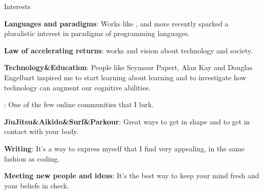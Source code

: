 \begin{rubric}{Interests}{

    \entry* \textbf{Languages and paradigms}: Works like
    ,
     and more recently
     sparked a pluralistic interest
    in paradigms of programming languages.

    \entry* \textbf{Law of accelerating returns}:  works and
    vision about technology and society. 

    \entry* \textbf{Technology\&Education}: People like 
    Seymour Papert, Alan Kay and Douglas Engelbart inspired me to
    start learning about learning and to investigate how technology can augment
    our cognitive abilities.

    \entry* \textbf{}: One of the few online
    communities that I lurk.

    \entry* \textbf{JiuJitsu\&Aikido\&Surf\&Parkour}: Great ways to get in shape and to get in
    contact with your body.

    \entry* \textbf{Writing}: It's a way to express myself that I find very
    appealing, in the same fashion as coding.

    \entry* \textbf{Meeting new people and ideas}: It's the best way to keep
    your mind fresh and your beliefs in check. 

}\end{rubric}

